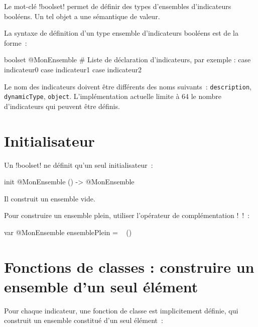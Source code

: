 




Le mot-clé \ggsq!boolset! permet de définir des types d'ensembles d'indicateurs booléens. Un tel objet a une sémantique de valeur.

La syntaxe de définition d'un type ensemble d'indicateurs booléens est de la forme~:

\begin{galgas34}
boolset @MonEnsemble {
  # Liste de déclaration d'indicateurs, par exemple :
  case indicateur0
  case indicateur1
  case indicateur2
}
\end{galgas34}

Le nom des indicateurs doivent être différents des noms suivants~: \texttt{description}, \texttt{dynamicType}, \texttt{object}. L'implémentation actuelle limite à 64 le nombre d'indicateurs qui peuvent être définis.

\section{Initialisateur}

Un \ggsq!boolset! ne définit qu'un seul initialisateur~:
\begin{galgas34}
init @MonEnsemble () -> @MonEnsemble
\end{galgas34}
Il construit un ensemble vide.

Pour construire un ensemble plein, utiliser l'opérateur de complémentation \ggsq!~!~:
\begin{galgas34}
var @MonEnsemble ensemblePlein = ~ ()
\end{galgas34}










\section{Fonctions de classes : construire un ensemble d'un seul élément}

Pour chaque indicateur, une fonction de classe est implicitement définie, qui construit un ensemble constitué d'un seul élément~:

